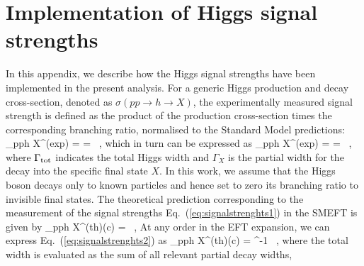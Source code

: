 \section{Implementation of Higgs signal strengths}
\label{sec:signalstrenghts}

In this appendix, we describe how the Higgs signal strengths
have been implemented in the present analysis.
%
For a generic Higgs production and decay cross-section, denoted as $\sigma(pp \to h \to X)$,
the experimentally measured signal strength is defined as the product of the production
cross-section times the corresponding branching ratio, normalised
to the Standard Model predictions:
\be
\mu_{pp\to h \to X}^{\rm (exp)} =  = 
 \, ,
 \ee
 which in turn can be expressed as
 \be
 \label{eq:signalstrenghts1}
\mu_{pp\to h \to X}^{\rm (exp)} =  = 
 \, ,
 \ee
where $\Gamma_{{\rm tot}}$ indicates the total Higgs width
and $\Gamma_{ X}$ is the partial width for
the decay into the specific final state $X$.
%
In this work, we assume that the Higgs boson decays only to known particles and hence set to zero
its branching ratio to invisible final states.
%
The theoretical prediction corresponding to the measurement
of the signal strengths Eq.~(\ref{eq:signalstrenghts1}) in the SMEFT is given by
\be
\label{eq:signalstrenghts2}
\mu_{pp\to h \to X}^{\rm (th)}({\boldsymbol c}) =  \lp {}\rp 
 \, ,
 \ee
 At any order in the EFT expansion, we can express Eq.~(\ref{eq:signalstrenghts2}) as
 \bea
 \label{eq:smeft_signal_1}
 \mu_{pp\to h \to X}^{\rm (th)}({\boldsymbol c}) =  \lp
 \rp \times
 \lp {}
 \rp \times
 \lp {}
 \rp^{-1} \, ,
 \eea
 where the total width is evaluated as the sum of all relevant partial decay widths,

